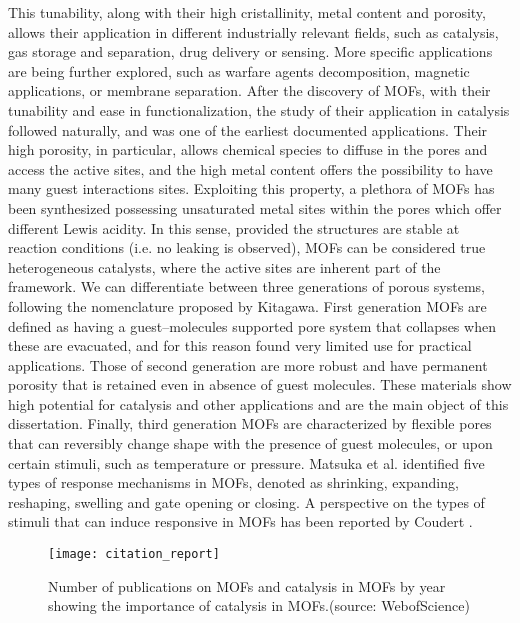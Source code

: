%
%
\npar
This tunability, along with their high cristallinity, metal content and porosity, allows their application in different industrially relevant fields, such as catalysis, gas storage and separation, drug delivery or sensing. More specific applications are being further explored, such as warfare agents decomposition, magnetic applications, or membrane separation. 
After the discovery of MOFs, with their tunability and ease in functionalization, the study of their application in catalysis followed naturally, and was one of the earliest documented applications\cite{Fujita1994}. 
Their high porosity, in particular, allows chemical species to diffuse in the pores and access the active sites, and the high metal content offers the possibility to have many guest interactions sites. Exploiting this property, a plethora of MOFs has been synthesized possessing unsaturated metal sites within the pores which offer different Lewis acidity. In this sense, provided the structures are stable at reaction conditions (i.e. no leaking is observed), MOFs can be considered true heterogeneous catalysts, where the active sites are inherent part of the framework. 
\npar
We can differentiate between three generations of porous systems, following the nomenclature proposed by Kitagawa\cite{kitagawa1998functional}. First generation MOFs are defined as having a guest--molecules supported pore system that collapses when these are evacuated, and for this reason found very limited use for practical applications. Those of second generation are more robust and have permanent porosity that is retained even in absence of guest molecules. These materials show high potential for catalysis and other applications and are the main object of this dissertation. Finally, third generation MOFs are characterized by flexible pores that can reversibly change shape with the presence of guest molecules, or upon certain stimuli, such as temperature or pressure. Matsuka et al.\cite{matsuda2004guest} identified five types of response mechanisms in MOFs, denoted as shrinking, expanding, reshaping, swelling and gate opening or closing. A perspective on the types of stimuli that can induce responsive in MOFs has been reported by Coudert \cite{coudert2015responsive}.
%
\begin{figure}[!htbp]
	\centering
 	\texttt{[image: citation\_report]}
	\caption{Number of publications on MOFs and catalysis in MOFs by year showing the importance of catalysis in MOFs.(source: WebofScience)}
	\label{fig:citation_report}
\end{figure}
%
